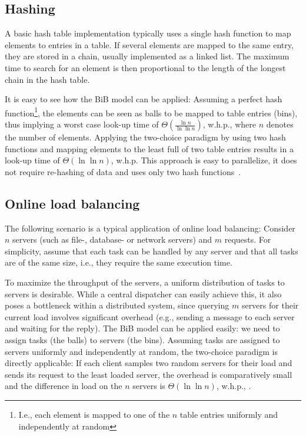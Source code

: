 \documentclass[a4paper,12pt]{article}
\begin{document}
\subsection{Hashing}
\label{sec:hashing}
A basic hash table implementation typically uses a single hash function to map elements to entries in a table. If several elements are mapped to the same entry, they are stored in a chain, usually implemented as a linked list. The maximum time to search for an element is then proportional to the length of the longest chain in the hash table. 

It is easy to see how the BiB model can be applied: Assuming a perfect hash function\footnote{I.e., each element is mapped to one of the $n$ table entries uniformly and independently at random}, the elements can be seen as balls to be mapped to table entries (bins), thus implying a worst case look-up time of $\Theta\left(\frac{\ln n}{\ln \ln n}\right)$, w.h.p., where $n$ denotes the number of elements. Applying the two-choice paradigm by using two hash functions and mapping elements to the least full of two table entries results in a look-up time of $\Theta\left(\ln \ln n\right)$, w.h.p. This approach is easy to parallelize, it does not require re-hashing of data and uses only two hash functions~\cite{ABKU99, MRS01}.

\subsection{Online load balancing}
\label{sec:loadbalancing}
The following scenario is a typical application of online load balancing: Consider $n$ servers (such as file-, database- or network servers) and $m$ requests. For simplicity, assume that each task can be handled by any server and that all tasks are of the same size, i.e., they require the same execution time.

To maximize the throughput of the servers, a uniform distribution of tasks to servers is desirable. While a central dispatcher can easily achieve this, it also poses a bottleneck within a distributed system, since querying $m$ servers for their current load involves significant overhead (e.g., sending a message to each server and waiting for the reply). The BiB model can be applied easily: we need to assign tasks (the balls) to servers (the bins). Assuming tasks are assigned to servers uniformly and independently at random, the two-choice paradigm is directly applicable: If each client samples two random servers for their load and sends its request to the least loaded server, the overhead is comparatively small and the difference in load on the $n$ servers is $\Theta\left(\ln \ln n\right)$, w.h.p., \cite{KLM92,RS98, MRS01}.  
\end{document}
